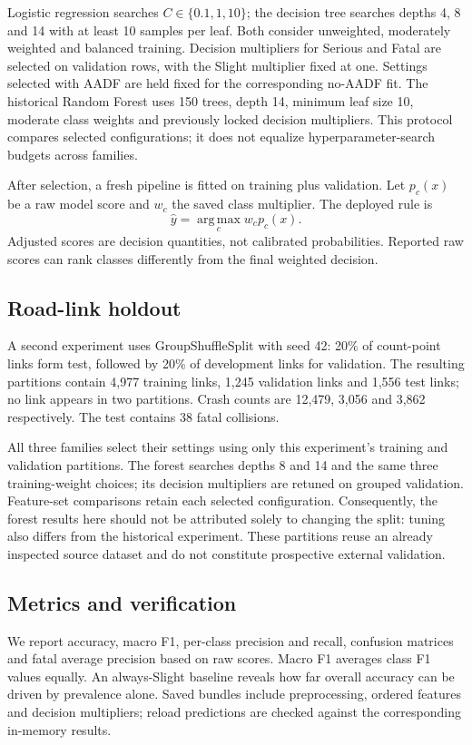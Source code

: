\documentclass[conference]{IEEEtran}
\begin{document}
Logistic regression searches $C\in\{0.1,1,10\}$; the decision tree searches depths 4, 8 and 14 with at least 10 samples per leaf. Both consider unweighted, moderately weighted and balanced training. Decision multipliers for Serious and Fatal are selected on validation rows, with the Slight multiplier fixed at one. Settings selected with AADF are held fixed for the corresponding no-AADF fit. The historical Random Forest uses 150 trees, depth 14, minimum leaf size 10, moderate class weights and previously locked decision multipliers. This protocol compares selected configurations; it does not equalize hyperparameter-search budgets across families.

After selection, a fresh pipeline is fitted on training plus validation. Let $p_c(x)$ be a raw model score and $w_c$ the saved class multiplier. The deployed rule is
\begin{equation}
 \hat{y}=\operatorname*{arg\,max}_{c} w_c p_c(x).
\end{equation}
Adjusted scores are decision quantities, not calibrated probabilities. Reported raw scores can rank classes differently from the final weighted decision.

\subsection{Road-link holdout}
A second experiment uses GroupShuffleSplit with seed 42: 20\% of count-point links form test, followed by 20\% of development links for validation. The resulting partitions contain 4,977 training links, 1,245 validation links and 1,556 test links; no link appears in two partitions. Crash counts are 12,479, 3,056 and 3,862 respectively. The test contains 38 fatal collisions.

All three families select their settings using only this experiment's training and validation partitions. The forest searches depths 8 and 14 and the same three training-weight choices; its decision multipliers are retuned on grouped validation. Feature-set comparisons retain each selected configuration. Consequently, the forest results here should not be attributed solely to changing the split: tuning also differs from the historical experiment. These partitions reuse an already inspected source dataset and do not constitute prospective external validation.

\subsection{Metrics and verification}
We report accuracy, macro F1, per-class precision and recall, confusion matrices and fatal average precision based on raw scores. Macro F1 averages class F1 values equally. An always-Slight baseline reveals how far overall accuracy can be driven by prevalence alone. Saved bundles include preprocessing, ordered features and decision multipliers; reload predictions are checked against the corresponding in-memory results.
\end{document}
